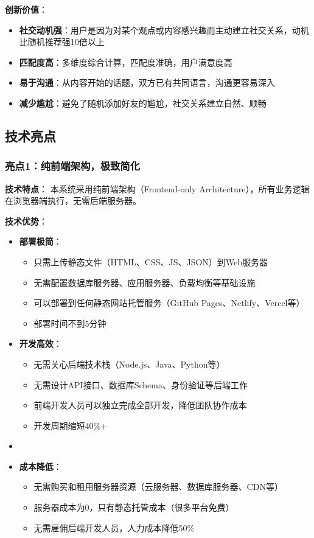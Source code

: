 \documentclass[12pt,a4paper]{article}
\begin{document}
\textbf{创新价值}：
\begin{itemize}
    \item \textbf{社交动机强}：用户是因为对某个观点或内容感兴趣而主动建立社交关系，动机比随机推荐强10倍以上
    \item \textbf{匹配度高}：多维度综合计算，匹配度准确，用户满意度高
    \item \textbf{易于沟通}：从内容开始的话题，双方已有共同语言，沟通更容易深入
    \item \textbf{减少尴尬}：避免了随机添加好友的尴尬，社交关系建立自然、顺畅
\end{itemize}

\subsection{技术亮点}

\subsubsection{亮点1：纯前端架构，极致简化}

\textbf{技术特点}：
本系统采用纯前端架构（Frontend-only Architecture），所有业务逻辑在浏览器端执行，无需后端服务器。

\textbf{技术优势}：
\begin{itemize}
    \item \textbf{部署极简}：
        \begin{itemize}
            \item 只需上传静态文件（HTML、CSS、JS、JSON）到Web服务器
            \item 无需配置数据库服务器、应用服务器、负载均衡等基础设施
            \item 可以部署到任何静态网站托管服务（GitHub Pages、Netlify、Vercel等）
            \item 部署时间不到5分钟
        \end{itemize}
    \item \textbf{开发高效}：
        \begin{itemize}
            \item 无需关心后端技术栈（Node.js、Java、Python等）
            \item 无需设计API接口、数据库Schema、身份验证等后端工作
            \item 前端开发人员可以独立完成全部开发，降低团队协作成本
            \item 开发周期缩短40\%+
        \end{itemize}
    \item \item \textbf{成本降低}：
        \begin{itemize}
            \item 无需购买和租用服务器资源（云服务器、数据库服务器、CDN等）
            \item 服务器成本为0，只有静态托管成本（很多平台免费）
            \item 无需雇佣后端开发人员，人力成本降低50\%
        \end{itemize}
\end{itemize}
\end{document}
